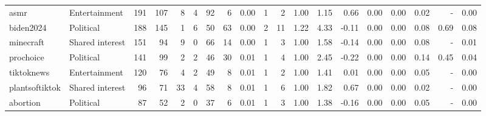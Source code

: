\begin{tabular}{llrrrrrrrrrrrrrrrrr}
            asmr &   Entertainment &    191 &    107 &                           8 &                            4 &            92 &                          6 &     0.00 &    1 &      2 & 1.00 &   1.15 &                               0.66 &   0.00 &         0.00 &                                0.02 &                                    - &                                     0.00 \\
       biden2024 &       Political &    188 &    145 &                           1 &                            6 &            50 &                         63 &     0.00 &    2 &     11 & 1.22 &   4.33 &                              -0.11 &   0.00 &         0.00 &                                0.08 &                                   0.69 &                                     0.08 \\
       minecraft & Shared interest &    151 &     94 &                           9 &                            0 &            66 &                         14 &     0.00 &    1 &      3 & 1.00 &   1.58 &                              -0.14 &   0.00 &         0.00 &                                0.08 &                                    - &                                     0.01 \\
       prochoice &       Political &    141 &     99 &                           2 &                            2 &            46 &                         30 &     0.01 &    1 &      4 & 1.00 &   2.45 &                              -0.22 &   0.00 &         0.00 &                                0.14 &                                   0.45 &                                     0.04 \\
      tiktoknews &   Entertainment &    120 &     76 &                           4 &                            2 &            49 &                          8 &     0.01 &    1 &      2 & 1.00 &   1.41 &                               0.01 &   0.00 &         0.00 &                                0.05 &                                    - &                                     0.00 \\
  plantsoftiktok & Shared interest &     96 &     71 &                          33 &                            4 &            58 &                          8 &     0.01 &    1 &      6 & 1.00 &   1.82 &                               0.67 &   0.00 &         0.00 &                                0.02 &                                    - &                                     0.00 \\
        abortion &       Political &     87 &     52 &                           2 &                            0 &            37 &                          6 &     0.01 &    1 &      3 & 1.00 &   1.38 &                              -0.16 &   0.00 &         0.00 &                                0.05 &                                    - &                                     0.00 \\

\end{tabular}
